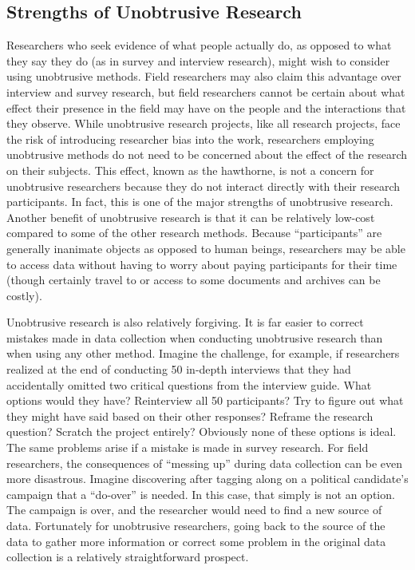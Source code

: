 \subsection{Strengths of Unobtrusive Research}

Researchers who seek evidence of what people actually do, as opposed to what they say they do (as in survey and interview research), might wish to consider using unobtrusive methods. Field researchers may also claim this advantage over interview and survey research, but field researchers cannot be certain about what effect their presence in the field may have on the people and the interactions that they observe. While unobtrusive research projects, like all research projects, face the risk of introducing researcher bias into the work, researchers employing unobtrusive methods do not need to be concerned about the effect of the research on their subjects. This effect, known as the \gls{hawthorne}, is not a concern for unobtrusive researchers because they do not interact directly with their research participants. In fact, this is one of the major strengths of unobtrusive research.
Another benefit of unobtrusive research is that it can be relatively low-cost compared to some of the other research methods. Because ``participants'' are generally inanimate objects as opposed to human beings, researchers may be able to access data without having to worry about paying participants for their time (though certainly travel to or access to some documents and archives can be costly).

Unobtrusive research is also relatively forgiving. It is far easier to correct mistakes made in data collection when conducting unobtrusive research than when using any other method. Imagine the challenge, for example, if researchers realized at the end of conducting 50 in-depth interviews that they had accidentally omitted two critical questions from the interview guide. What options would they have? Reinterview all 50 participants? Try to figure out what they might have said based on their other responses? Reframe the research question? Scratch the project entirely? Obviously none of these options is ideal. The same problems arise if a mistake is made in survey research. For field researchers, the consequences of ``messing up'' during data collection can be even more disastrous. Imagine discovering after tagging along on a political candidate's campaign that a ``do-over'' is needed. In this case, that simply is not an option. The campaign is over, and the researcher would need to find a new source of data. Fortunately for unobtrusive researchers, going back to the source of the data to gather more information or correct some problem in the original data collection is a relatively straightforward prospect.

